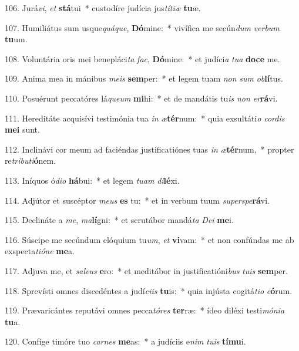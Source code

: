 106. Jurá\textit{vi}, \textit{et} \textbf{stá}tui~*  custodíre judícia jus\textit{tí}\textit{ti}\textit{æ} \textbf{tu}æ.\

107. Humiliátus sum usque\textit{quá}\textit{que}, \textbf{Dó}mine:~*  vivífica me secún\textit{dum} \textit{ver}\textit{bum} \textbf{tu}um.\

108. Voluntária oris mei benepláci\textit{ta} \textit{fac}, \textbf{Dó}mine:~*  et judíci\textit{a} \textit{tu}\textit{a} \textbf{do}\textbf{ce} me.\

109. Anima mea in mánibus \textit{me}\textit{is} \textbf{sem}per:~*  et legem tuam \textit{non} \textit{sum} \textit{ob}\textbf{lí}tus.\

110. Posuérunt peccatóres lá\textit{que}\textit{um} \textbf{mi}hi:~*  et de mandátis tu\textit{is} \textit{non} \textit{er}\textbf{rá}vi.\

111. Hereditáte acquisívi testimónia tua \textit{in} \textit{æ}\textbf{tér}num:~*  quia exsultáti\textit{o} \textit{cor}\textit{dis} \textbf{me}\textbf{i} sunt.\

112. Inclinávi cor meum ad faciéndas justificatiónes tuas \textit{in} \textit{æ}\textbf{tér}num,~*  propter re\textit{tri}\textit{bu}\textit{ti}\textbf{ó}nem.\

113. Iníquos ó\textit{di}\textit{o} \textbf{há}bui:~*  et legem \textit{tu}\textit{am} \textit{di}\textbf{lé}xi.\

114. Adjútor et suscéptor \textit{me}\textit{us} \textbf{es} tu:~*  et in verbum tuum \textit{su}\textit{per}\textit{spe}\textbf{rá}vi.\

115. Declináte a \textit{me}, \textit{ma}\textbf{lí}gni:~*  et scrutábor mandá\textit{ta} \textit{De}\textit{i} \textbf{me}i.\

116. Súscipe me secúndum elóquium tu\textit{um}, \textit{et} \textbf{vi}vam:~*  et non confúndas me ab exspecta\textit{ti}\textit{ó}\textit{ne} \textbf{me}a.\

117. Adjuva me, et \textit{sal}\textit{vus} \textbf{e}ro:~*  et meditábor in justificatióni\textit{bus} \textit{tu}\textit{is} \textbf{sem}per.\

118. Sprevísti omnes discedéntes a judí\textit{ci}\textit{is} \textbf{tu}is:~*  quia injústa cogitá\textit{ti}\textit{o} \textit{e}\textbf{ó}rum.\

119. Prævaricántes reputávi omnes pecca\textit{tó}\textit{res} \textbf{ter}ræ:~*  ídeo diléxi testi\textit{mó}\textit{ni}\textit{a} \textbf{tu}a.\

120. Confíge timóre tuo \textit{car}\textit{nes} \textbf{me}as:~*  a judíciis e\textit{nim} \textit{tu}\textit{is} \textbf{tí}\textbf{mu}i.\

